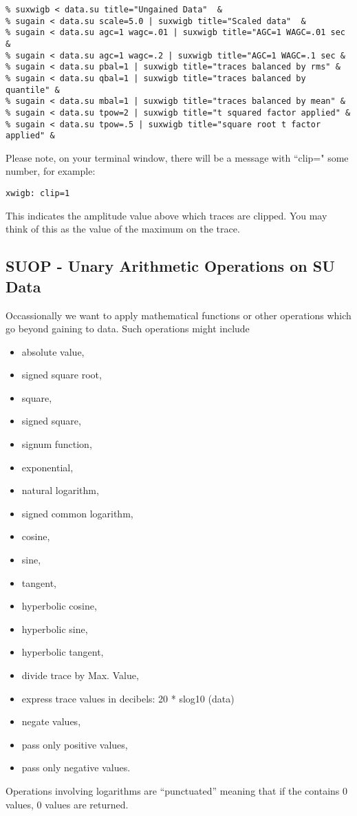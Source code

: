 {{{{{{{{\small\begin{verbatim}
% suxwigb < data.su title="Ungained Data"  &
% sugain < data.su scale=5.0 | suxwigb title="Scaled data"  &
% sugain < data.su agc=1 wagc=.01 | suxwigb title="AGC=1 WAGC=.01 sec &
% sugain < data.su agc=1 wagc=.2 | suxwigb title="AGC=1 WAGC=.1 sec &
% sugain < data.su pbal=1 | suxwigb title="traces balanced by rms" &
% sugain < data.su qbal=1 | suxwigb title="traces balanced by quantile" &
% sugain < data.su mbal=1 | suxwigb title="traces balanced by mean" &
% sugain < data.su tpow=2 | suxwigb title="t squared factor applied" &
% sugain < data.su tpow=.5 | suxwigb title="square root t factor applied" &
\end{verbatim}}\noindent
Please note, on your terminal window, there will be a message
with ``clip=" some number, for example:
{\small\begin{verbatim}
xwigb: clip=1
\end{verbatim}}\noindent
This indicates the amplitude value above which traces are clipped.
You may think of this as the value of the maximum on the trace.

\subsection{SUOP - Unary Arithmetic Operations on SU Data}

Occassionally we want to apply mathematical functions or
other operations which go beyond gaining to data. Such
operations might include
\begin{itemize}
\item absolute value,
\item signed square root,
\item square,
\item signed square,			
\item signum function,			
\item exponential,
\item natural logarithm,
\item signed common logarithm,		
\item cosine,				
\item sine,				
\item tangent,
\item hyperbolic cosine,		
\item hyperbolic sine,
\item hyperbolic tangent,
\item divide trace by Max. Value,	
\item express trace values in decibels:  20 * slog10 (data)		
\item negate values,
\item pass only positive values,	
\item pass only negative values.
\end{itemize}
Operations involving logarithms are ``punctuated'' meaning
that if the  contains 0 values,	0 values are returned.		

}}}}}}}
